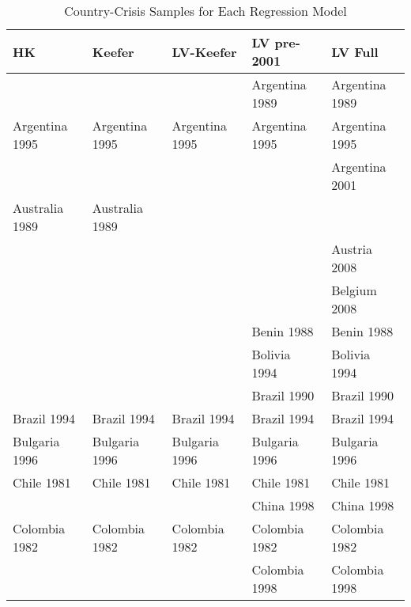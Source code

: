 \begin{table}[ht]
\centering
\caption{Country-Crisis Samples for Each Regression Model} 
{\tiny
\begin{tabular}{lllll}
  \hline
\textbf{HK} & \textbf{Keefer} & \textbf{LV-Keefer} & \textbf{LV pre-2001} & \textbf{LV Full} \\ 
  \hline
 &  &  & Argentina 1989\cellcolor[gray]{0.5} & Argentina 1989\cellcolor[gray]{0.5} \\ 
  Argentina 1995\cellcolor[gray]{0.5} & Argentina 1995\cellcolor[gray]{0.5} & Argentina 1995\cellcolor[gray]{0.5} & Argentina 1995\cellcolor[gray]{0.5} & Argentina 1995\cellcolor[gray]{0.5} \\ 
   &  &  &  & Argentina 2001\cellcolor[gray]{0.5} \\ 
  Australia 1989\cellcolor[gray]{0.5} & Australia 1989\cellcolor[gray]{0.5} &  &  &  \\ 
   &  &  &  & Austria 2008\cellcolor[gray]{0.5} \\ 
   &  &  &  & Belgium 2008\cellcolor[gray]{0.5} \\ 
   &  &  & Benin 1988\cellcolor[gray]{1} & Benin 1988\cellcolor[gray]{1} \\ 
   &  &  & Bolivia 1994\cellcolor[gray]{0.5} & Bolivia 1994\cellcolor[gray]{0.5} \\ 
   &  &  & Brazil 1990\cellcolor[gray]{0.5} & Brazil 1990\cellcolor[gray]{0.5} \\ 
  Brazil 1994\cellcolor[gray]{0.5} & Brazil 1994\cellcolor[gray]{0.5} & Brazil 1994\cellcolor[gray]{0.5} & Brazil 1994\cellcolor[gray]{0.5} & Brazil 1994\cellcolor[gray]{0.5} \\ 
  Bulgaria 1996\cellcolor[gray]{0.5} & Bulgaria 1996\cellcolor[gray]{0.5} & Bulgaria 1996\cellcolor[gray]{0.5} & Bulgaria 1996\cellcolor[gray]{0.5} & Bulgaria 1996\cellcolor[gray]{0.5} \\ 
  Chile 1981\cellcolor[gray]{1} & Chile 1981\cellcolor[gray]{1} & Chile 1981\cellcolor[gray]{1} & Chile 1981\cellcolor[gray]{1} & Chile 1981\cellcolor[gray]{1} \\ 
   &  &  & China 1998\cellcolor[gray]{1} & China 1998\cellcolor[gray]{1} \\ 
  Colombia 1982\cellcolor[gray]{0.5} & Colombia 1982\cellcolor[gray]{0.5} & Colombia 1982\cellcolor[gray]{0.5} & Colombia 1982\cellcolor[gray]{0.5} & Colombia 1982\cellcolor[gray]{0.5} \\ 
   &  &  & Colombia 1998\cellcolor[gray]{0.5} & Colombia 1998\cellcolor[gray]{0.5} \\ 

\end{tabular}}
\end{table}
